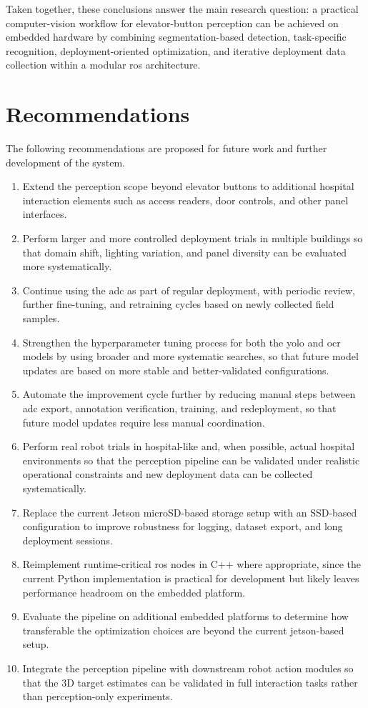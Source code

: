 Taken together, these conclusions answer the main research question: a practical
computer-vision workflow for elevator-button perception can be achieved on
embedded hardware by combining segmentation-based detection, task-specific
recognition, deployment-oriented optimization, and iterative deployment data
collection within a modular \gls{ros} architecture.

\section{Recommendations}

The following recommendations are proposed for future work and further
development of the system.

\begin{enumerate}
    \item Extend the perception scope beyond elevator buttons to additional hospital interaction elements such as access readers, door controls, and other panel interfaces.
    \item Perform larger and more controlled deployment trials in multiple buildings so that domain shift, lighting variation, and panel diversity can be evaluated more systematically.
    \item Continue using the \gls{adc} as part of regular deployment, with periodic review, further fine-tuning, and retraining cycles based on newly collected field samples.
    \item Strengthen the hyperparameter tuning process for both the \gls{yolo} and \gls{ocr} models by using broader and more systematic searches, so that future model updates are based on more stable and better-validated configurations.
    \item Automate the improvement cycle further by reducing manual steps between \gls{adc} export, annotation verification, training, and redeployment, so that future model updates require less manual coordination.
    \item Perform real robot trials in hospital-like and, when possible, actual hospital environments so that the perception pipeline can be validated under realistic operational constraints and new deployment data can be collected systematically.
    \item Replace the current Jetson microSD-based storage setup with an SSD-based configuration to improve robustness for logging, dataset export, and long deployment sessions.
    \item Reimplement runtime-critical \gls{ros} nodes in C++ where appropriate, since the current Python implementation is practical for development but likely leaves performance headroom on the embedded platform.
    \item Evaluate the pipeline on additional embedded platforms to determine how transferable the optimization choices are beyond the current \gls{jetson}-based setup.
    \item Integrate the perception pipeline with downstream robot action modules so that the 3D target estimates can be validated in full interaction tasks rather than perception-only experiments.
\end{enumerate}

